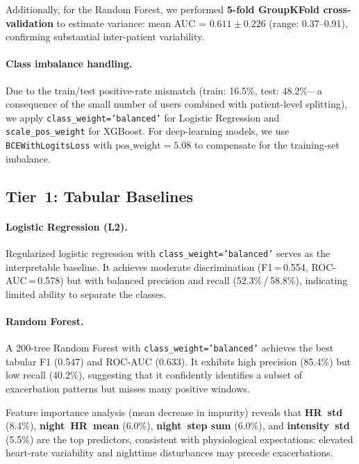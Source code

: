 \documentclass[11pt,a4paper]{article}
\begin{document}
Additionally, for the Random Forest, we performed \textbf{5-fold GroupKFold
cross-validation} to estimate variance: mean AUC = $0.611 \pm 0.226$ (range:
0.37--0.91), confirming substantial inter-patient variability.

\paragraph{Class imbalance handling.}
Due to the train/test positive-rate mismatch (train: 16.5\%, test: 48.2\%—a
consequence of the small number of users combined with patient-level splitting),
we apply \texttt{class\_weight='balanced'} for Logistic Regression and
\texttt{scale\_pos\_weight} for XGBoost.  For deep-learning models, we use
\texttt{BCEWithLogitsLoss} with $\text{pos\_weight} = 5.08$ to compensate for
the training-set imbalance.

\subsection{Tier~1: Tabular Baselines}\label{sec:tier1}

\paragraph{Logistic Regression (L2).}
Regularized logistic regression with \texttt{class\_weight='balanced'} serves
as the interpretable baseline.  It achieves moderate discrimination
(F1\,=\,0.554, ROC-AUC\,=\,0.578) but with balanced precision and recall
(52.3\%\,/\,58.8\%), indicating limited ability to separate the classes.

\paragraph{Random Forest.}
A 200-tree Random Forest with \texttt{class\_weight='balanced'} achieves the
best tabular F1 (0.547) and ROC-AUC (0.633).  It exhibits high precision
(85.4\%) but low recall (40.2\%), suggesting that it confidently identifies a
subset of exacerbation patterns but misses many positive windows.

Feature importance analysis (mean decrease in impurity) reveals that
\textbf{HR~std} (8.4\%), \textbf{night~HR~mean} (6.0\%), \textbf{night~step
sum} (6.0\%), and \textbf{intensity~std} (5.5\%) are the top predictors,
consistent with physiological expectations: elevated heart-rate variability and
nighttime disturbances may precede exacerbations.
\end{document}
